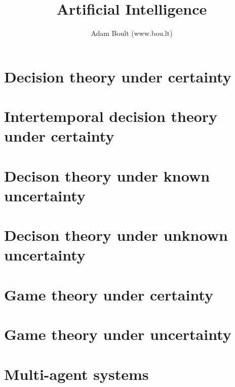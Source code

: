 \documentclass[oneside]{book}
\begin{document}
\author{Adam Boult (www.bou.lt)}
\title{Artificial Intelligence}
\maketitle

\setcounter{tocdepth}{0}
\tableofcontents



\part{Decision theory under certainty}




\part{Intertemporal decision theory under certainty}




\part{Decison theory under known uncertainty}



\part{Decison theory under unknown uncertainty}






\part{Game theory under certainty}





\part{Game theory under uncertainty}



\part{Multi-agent systems}
\end{document}
